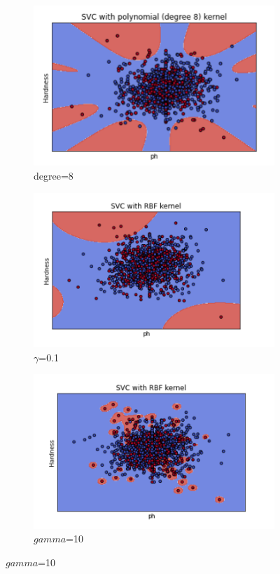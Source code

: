 \documentclass{article}
\begin{document}
\begin{figure}[!h]
	\centering
	\begin{subfigure}[b]{0.25\textwidth}
		\centering
		\includegraphics[width=\textwidth]{../resultats/degree=8}
		\caption*{degree=8}
		\label{fig:knn}
	\end{subfigure}
	\begin{subfigure}[b]{0.25\textwidth}
		\centering
		\includegraphics[width=\textwidth]{../resultats/gamma = 0.1}
		\caption*{$\gamma$=0.1}
		\label{fig:three sin x}
	\end{subfigure}
	\begin{subfigure}[b]{0.25\textwidth}
		\centering
		\includegraphics[width=\textwidth]{../resultats/gamma = 10}
		\caption*{$gamma$=10}
		\label{fig:three sin x}
	\end{subfigure}
\end{figure}
\end{document}
